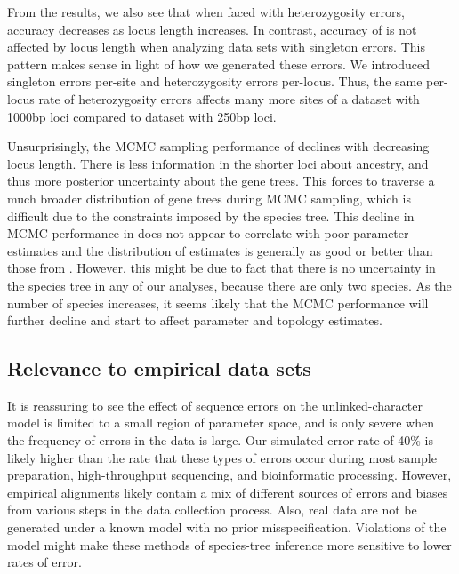 From the \ecoevolity results,
we also see that when faced with heterozygosity errors,
accuracy decreases as locus length increases.
In contrast, accuracy of \ecoevolity is not affected by locus
length when analyzing data sets with singleton errors.
This pattern makes sense in light of how we generated these errors.
We introduced singleton errors per-site and heterozygosity errors per-locus.
Thus, the same per-locus rate of heterozygosity errors affects many more sites
of a dataset with 1000bp loci compared to dataset with 250bp loci.

Unsurprisingly, the MCMC sampling performance of \beast declines with
decreasing locus length.
There is less information in the shorter loci about ancestry, and thus more
posterior uncertainty about the gene trees.
This forces \beast to traverse a much broader distribution of gene trees during
MCMC sampling, which is difficult due to the constraints imposed by the
species tree.
This decline in MCMC performance in \beast does not appear to correlate with
poor parameter estimates and the distribution of estimates is generally as good
or better than those from \ecoevolity. 
However, this might be due to fact that there is no uncertainty in the species
tree in any of our analyses, because there are only two species.
As the number of species increases, it seems likely that the MCMC performance
will further decline and start to affect parameter and topology estimates.


\subsection{Relevance to empirical data sets}
It is reassuring to see the effect of sequence errors on the unlinked-character
model is limited to a small region of parameter space, and is only severe when
the frequency of errors in the data is large.
Our simulated error rate of 40\% is likely higher than the rate that these
types of errors occur during most sample preparation, high-throughput sequencing,
and bioinformatic processing.
However, empirical alignments likely contain a mix of different sources of
errors and biases from various steps in the data collection process.
Also, real data are not be generated under a known model with no prior
misspecification.
Violations of the model might make these methods of species-tree inference more
sensitive to lower rates of error.

